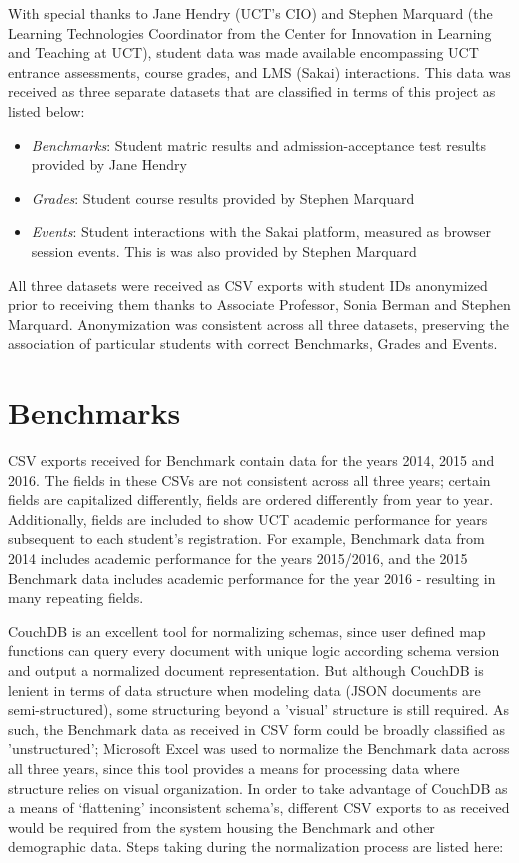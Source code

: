 With special thanks to Jane Hendry (UCT's CIO) and Stephen Marquard (the Learning Technologies Coordinator from the Center for Innovation in Learning and Teaching at UCT), student data was made available encompassing UCT entrance assessments, course grades, and LMS (Sakai) interactions. This data was received as three separate datasets that are classified in terms of this project as listed below:

\begin{itemize}
    \item \textit{Benchmarks}: Student matric results and admission-acceptance test results provided by Jane Hendry
    \item \textit{Grades}: Student course results provided by Stephen Marquard
    \item \textit{Events}: Student interactions with the Sakai platform, measured as browser session events. This is was also provided by Stephen Marquard
\end{itemize}

All three datasets were received as CSV exports with student IDs anonymized prior to receiving them thanks to Associate Professor, Sonia Berman and Stephen Marquard. Anonymization was consistent across all three datasets, preserving the association of particular students with correct Benchmarks, Grades and Events.

\section{Benchmarks}
CSV exports received for Benchmark contain data for the years 2014, 2015 and 2016. The fields in these CSVs are not consistent across all three years; certain fields are capitalized differently, fields are ordered differently from year to year. Additionally, fields are included to show UCT academic performance for years subsequent to each student's registration. For example, Benchmark data from 2014 includes academic performance for the years 2015/2016, and the 2015 Benchmark data includes academic performance for the year 2016 - resulting in many repeating fields.

CouchDB is an excellent tool for normalizing schemas, since user defined map functions can query every document with unique logic according schema version and output a normalized document representation. But although CouchDB is lenient in terms of data structure when modeling data (JSON documents are semi-structured), some structuring beyond a 'visual' structure is still required. As such, the Benchmark data as received in CSV form could be broadly classified as 'unstructured'; Microsoft Excel was used to normalize the Benchmark data across all three years, since this tool provides a means for processing data where structure relies on visual organization. In order to take advantage of CouchDB as a means of `flattening' inconsistent schema's, different CSV exports to as received would be required from the system housing the Benchmark and other demographic data. Steps taking during the normalization process are listed here:

